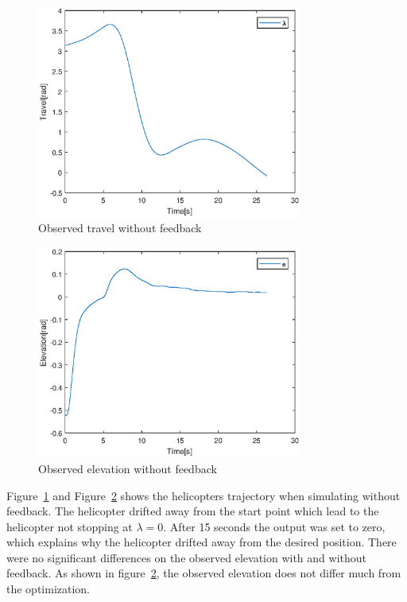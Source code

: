 \begin{figure}[H]
\includegraphics[width=1\linewidth, height=7cm]{data_10.4/travel_uten_feedback_eps.eps} 
\centering
\caption{Observed travel without feedback}\label{fig:travelufeedback}
\end{figure}

\begin{figure}[H]
\includegraphics[width=1\linewidth, height=7cm]{data_10.4/elevation_uten_feedback_eps.eps} 
\centering
\caption{Observed elevation without feedback}\label{fig:elevationufeedback}
\end{figure}

Figure~\ref{fig:travelufeedback} and Figure~\ref{fig:elevationufeedback} shows the helicopters trajectory when simulating without feedback. The helicopter drifted away from the start point which lead to the helicopter not stopping at $\lambda = 0$. After 15 seconds the output was set to zero, which explains why the helicopter drifted away from the desired position. There were no significant differences on the observed elevation with and without feedback. As shown in figure~\ref{fig:elevationufeedback}, the observed elevation does not differ much from the optimization. 

